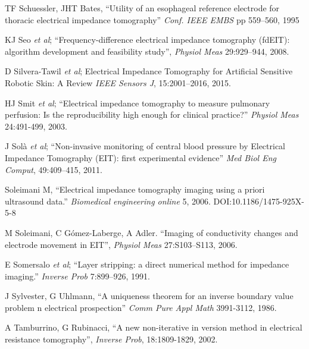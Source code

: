 \documentclass[12pt]{article} \usepackage[margin=3cm]{geometry} \usepackage[margin=20pt,font=small,labelfont=bf]{caption}\def\TBLWIDA{35mm}\def\TBLWIDB{95mm}
\newcommand{\ifmaxthree}[2]{#2 {\em et al}; }
\begin{document}
\begin{thebibliography}{00}
TF Schuessler, JHT Bates, 
``Utility of an esophageal reference electrode for thoracic electrical impedance tomography''
{\em Conf. IEEE EMBS} pp 559--560, 1995

\ifmaxthree{
JK Seo, J Lee, SW Kim, H Zribi, EJe Woo;
}{
KJ Seo
}
``Frequency-difference electrical impedance tomography (fdEIT): algorithm development and feasibility study'',
{\em  Physiol Meas} 29:929--944, 2008.


\ifmaxthree{
David Silvera-Tawil ; David Rye ; Manuchehr Soleimani ; Mari Velonaki
}{
D Silvera-Tawil
}
Electrical Impedance Tomography for Artificial Sensitive Robotic Skin: A Review
{\em IEEE Sensors J}, 15:2001--2016, 2015.

\ifmaxthree{
HJ Smit, ML Handoko, A Vonk Noordegraaf, TJ Faes, PE Postmus, PM de Vries, A Boonstra
}{
HJ Smit
}
``Electrical impedance tomography to measure pulmonary perfusion: Is the
reproducibility high enough for clinical practice?''
{\em Physiol Meas} 24:491-499, 2003.

\ifmaxthree{
J Solà, A Adler, A Santos, G Tusman, FS Sipmann, SH Böhm,
}{
J Solà
}
``Non-invasive monitoring of central blood pressure by Electrical Impedance
Tomography (EIT): first experimental evidence''
{\em Med Biol Eng Comput}, 49:409--415, 2011.

Soleimani M, ``Electrical impedance tomography imaging using a priori ultrasound data.''
{\em Biomedical engineering online} 5, 2006. %
DOI:10.1186/1475-925X-5-8

M Soleimani, C Gómez-Laberge, A Adler.
``Imaging of conductivity changes and electrode movement in EIT'',
{\em Physiol Meas} 27:S103--S113, 2006.

\ifmaxthree{
E Somersalo, M Cheney, D Isaacson, E Isaacson. 
}{
E Somersalo
}
``Layer stripping: a direct numerical method for impedance imaging.''
{\em Inverse Prob} 7:899--926, 1991.

J Sylvester, G Uhlmann,
``A uniqueness theorem for an inverse
boundary value problem n electrical prospection''
{\em Comm Pure Appl Math} 3991-3112, 1986.

A Tamburrino, G Rubinacci,
``A new non-iterative in version method in electrical resistance tomography'',
{\em Inverse Prob}, 18:1809-1829, 2002.


\end{thebibliography}
\end{document}
